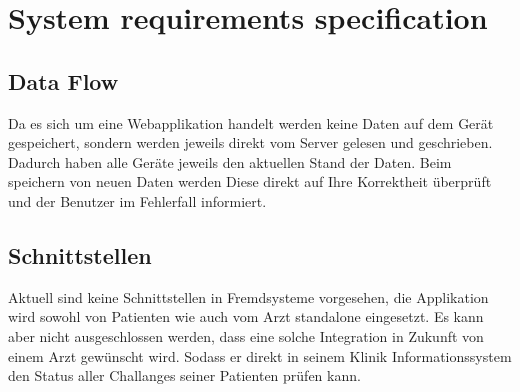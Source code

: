 \chapter{System requirements specification}
\section{Data Flow}
Da es sich um eine Webapplikation handelt werden keine Daten auf dem Gerät gespeichert, sondern werden jeweils direkt vom Server gelesen und geschrieben. Dadurch haben alle Geräte jeweils den aktuellen Stand der Daten. Beim speichern von neuen Daten werden Diese direkt auf Ihre Korrektheit überprüft und der Benutzer im Fehlerfall informiert.
\section{Schnittstellen}
Aktuell sind keine Schnittstellen in Fremdsysteme vorgesehen, die Applikation wird sowohl von Patienten wie auch vom Arzt standalone eingesetzt. Es kann aber nicht ausgeschlossen werden, dass eine solche Integration in Zukunft von einem Arzt gewünscht wird. Sodass er direkt in seinem Klinik Informationssystem den Status aller Challanges seiner Patienten prüfen kann.